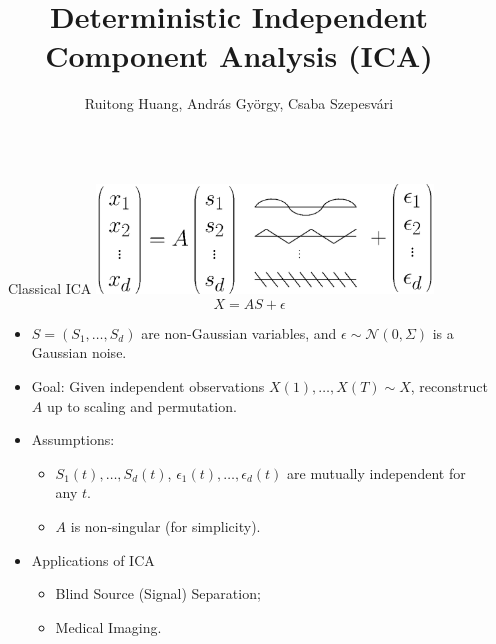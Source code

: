 \documentclass[final]{beamer} %
\title{Deterministic Independent Component Analysis (ICA)}
\author{Ruitong Huang, Andr\'as Gy\"orgy, Csaba Szepesv\'{a}ri}
\newcommand{\eps}{\epsilon}
\begin{document}
\begin{frame}[c]
	\vspace{-1.5cm}

	\begin{columns}[t,totalwidth=\textwidth]
	
	\begin{column}{0.01\textwidth}
	\end{column}

 	\begin{column}{.24\textwidth}%
		\begin{block}{Classical ICA}
			\centering
			\includegraphics[width=0.7\textwidth]{ICA_model.eps}
			\begin{equation*}
				\label{eq:stoch-ICA}
				X = AS+\epsilon
			\end{equation*}
			\vspace{-1.5cm}
			\begin{itemize}
				\item $S = (S_1,\ldots, S_d)$ are non-Gaussian variables, and	$\eps \sim \mathcal{N}(0,\Sigma)$ is a Gaussian noise. 
				\item Goal: Given independent observations $X(1), \ldots, X(T) \sim X$, reconstruct $A$ up to scaling and permutation.
\item Assumptions:
                          \begin{itemize}
				\item $S_1(t),\ldots, S_d(t)$, $\eps_1(t), \ldots, \eps_d(t)$ are mutually independent for any $t$.
				\item $A$ is non-singular
                                  (for simplicity). 
                             \end{itemize}
				\item Applications of ICA	
				\begin{itemize}
						\item Blind Source (Signal) Separation;
						\item Medical Imaging.
				\end{itemize}				
			\end{itemize}	
\end{block}


\end{column}
\end{columns}
\end{frame}
\end{document}
